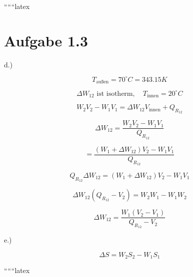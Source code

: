 ``````latex

\section*{Aufgabe 1.3}

d.)

\[
T_{\text{außen}} = 70^\circ C = 343.15 K
\]

\[
\Delta W_{12} \text{ ist } \text{isotherm}, \quad T_{\text{innen}} = 20^\circ C
\]

\[
W_2 V_2 - W_1 V_1 = \Delta W_{12} V_{\text{innen}} + Q_{R_{12}}
\]

\[
\Delta W_{12} = \frac{W_2 V_2 - W_1 V_1}{Q_{R_{12}}}
\]

\[
= \frac{(W_1 + \Delta W_{12}) V_2 - W_1 V_1}{Q_{R_{12}}}
\]

\[
Q_{R_{12}} \Delta W_{12} = (W_1 + \Delta W_{12}) V_2 - W_1 V_1
\]

\[
\Delta W_{12} (Q_{R_{12}} - V_2) = W_2 W_1 - W_1 W_2
\]

\[
\Delta W_{12} = \frac{W_1 (V_2 - V_1)}{Q_{R_{12}} - V_2}
\]

e.)

\[
\Delta S = W_2 S_2 - W_1 S_1
\]

``````latex


